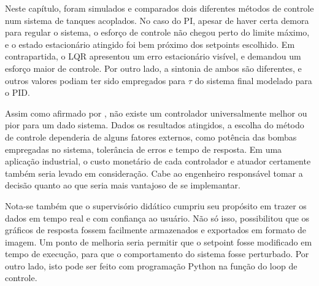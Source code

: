 Neste capítulo, foram simulados e comparados dois diferentes métodos de controle num sistema de tanques acoplados. No caso do PI, apesar de haver certa demora para regular o sistema, o esforço de controle não chegou perto do limite máximo, e o estado estacionário atingido foi bem próximo dos setpoints escolhido. Em contrapartida, o LQR apresentou um erro estacionário visível, e demandou um esforço maior de controle. Por outro lado, a sintonia de ambos são diferentes, e outros valores podiam ter sido empregados para $\tau$ do sistema final modelado para o PID.

Assim como afirmado por \cite{Lourenco2007}, não existe um controlador universalmente melhor ou pior para um dado sistema. Dados os resultados atingidos, a escolha do método de controle dependeria de alguns fatores externos, como potência das bombas empregadas no sistema, tolerância de erros e tempo de resposta. Em uma aplicação industrial, o custo monetário de cada controlador e atuador certamente também seria levado em consideração. Cabe ao engenheiro responsável tomar a decisão quanto ao que seria mais vantajoso de se implemantar.

Nota-se também que o supervisório didático cumpriu seu propósito em trazer os dados em tempo real e com confiança ao usuário. Não só isso, possibilitou que os gráficos de resposta fossem facilmente armazenados e exportados em formato de imagem. Um ponto de melhoria seria permitir que o setpoint fosse modificado em tempo de execução, para que o comportamento do sistema fosse perturbado. Por outro lado, isto pode ser feito com programação Python na função do loop de controle.